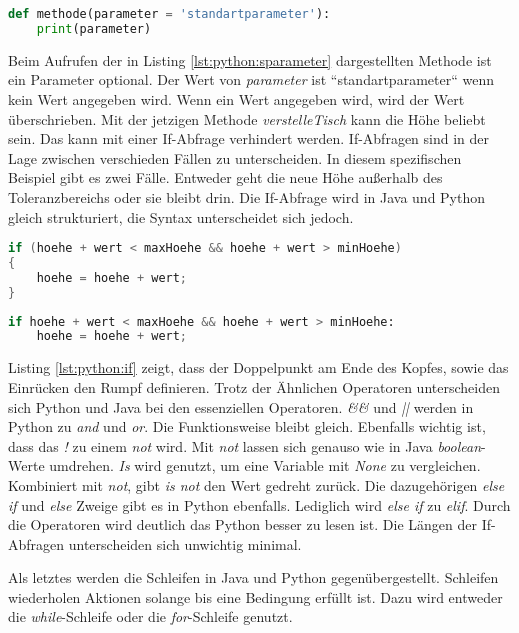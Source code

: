\begin{lstlisting}[language=python,caption={Methode in Python mit Standartparameter},captionpos=b,label={lst:python:sparameter},frame=none]
def methode(parameter = 'standartparameter'):
    print(parameter)
\end{lstlisting}

Beim Aufrufen der in Listing \ref{lst:python:sparameter} dargestellten Methode ist ein Parameter optional. Der Wert von \textit{parameter} ist “standartparameter“ wenn kein Wert angegeben wird. Wenn ein Wert angegeben wird, wird der Wert überschrieben.
Mit der jetzigen Methode \textit{verstelleTisch} kann die Höhe beliebt sein. Das kann mit einer If-Abfrage verhindert werden. If-Abfragen sind in der Lage zwischen verschieden Fällen zu unterscheiden. In diesem spezifischen Beispiel gibt es zwei Fälle. Entweder geht die neue Höhe außerhalb des Toleranzbereichs oder sie bleibt drin. Die If-Abfrage wird in Java und Python gleich strukturiert, die Syntax unterscheidet sich jedoch. \cite{Python3:Buch}\cite{Louis:2010}

\begin{lstlisting}[language=java,caption={If-Abfrage in Java},captionpos=b,label={lst:java:if},frame=none]
if (hoehe + wert < maxHoehe && hoehe + wert > minHoehe)
{
    hoehe = hoehe + wert;
}
\end{lstlisting}

\begin{lstlisting}[language=python,caption={If-Abfrage in Python},captionpos=b,label={lst:python:if},frame=none]
if hoehe + wert < maxHoehe && hoehe + wert > minHoehe:
    hoehe = hoehe + wert;
\end{lstlisting}

Listing \ref{lst:python:if} zeigt, dass der Doppelpunkt am Ende des Kopfes, sowie das Einrücken den Rumpf definieren.
Trotz der Ähnlichen Operatoren unterscheiden sich Python und Java bei den essenziellen Operatoren. \textit{\&\&} und \textit{||} werden in Python zu \textit{and} und \textit{or}. Die Funktionsweise bleibt gleich. Ebenfalls wichtig ist, dass das \textit{!} zu einem \textit{not} wird. Mit \textit{not} lassen sich genauso wie in Java \textit{boolean}-Werte umdrehen. \textit{Is} wird genutzt, um eine Variable mit \textit{None} zu vergleichen. Kombiniert mit \textit{not}, gibt \textit{is not} den Wert gedreht zurück. \cite{Python3:Buch}\cite{Louis:2010}
Die dazugehörigen \textit{else if} und \textit{else} Zweige gibt es in Python ebenfalls. Lediglich wird \textit{else if} zu \textit{elif}. Durch die Operatoren wird deutlich das Python besser zu lesen ist. Die Längen der If-Abfragen unterscheiden sich unwichtig minimal.\par
Als letztes werden die Schleifen in Java und Python gegenübergestellt. Schleifen wiederholen Aktionen solange bis eine Bedingung erfüllt ist. Dazu wird entweder die \textit{while}-Schleife oder die \textit{for}-Schleife genutzt.

